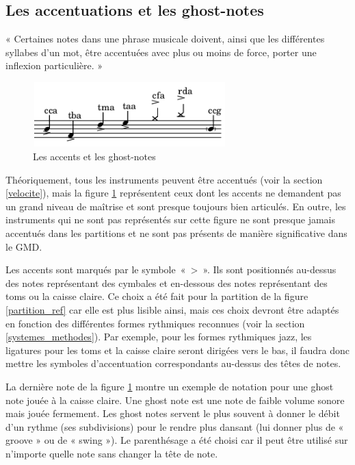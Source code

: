 \subsection*{Les accentuations et les ghost-notes}
« Certaines notes dans une phrase musicale doivent, ainsi que les différentes
syllabes d’un mot, être accentuées avec plus ou moins de force, porter une
inflexion particulière. » \cite{danhauser}
\begin{figure}[h]
\centering
\includegraphics[height=25mm, width=75mm]{
z_images/3_methodes/0_notation_de_la_batterie/8_accents_et_ghost-notes_0.png}
\caption{Les accents et les ghost-notes}
\label{accents_et_gn}
\end{figure}

Théoriquement, tous les instruments peuvent être accentués (voir la section
\ref{velocite}), mais la figure \ref{accents_et_gn} représentent ceux dont les
accents ne demandent pas un grand niveau de maîtrise et sont presque toujours
bien articulés. En outre, les instruments qui ne sont pas représentés sur cette
figure ne sont presque jamais accentués dans les partitions et ne sont pas
présents de manière significative dans le GMD.

Les accents sont marqués par le symbole~«~>~». Ils sont positionnés au-dessus
des notes représentant des cymbales et en-dessous des notes représentant des
toms ou la caisse claire. Ce choix a été fait pour la partition de la figure
\ref{partition_ref} car elle est plus lisible ainsi, mais ces choix devront
être adaptés en fonction des différentes formes rythmiques reconnues (voir la
section \ref{systemes_methodes}). Par exemple, pour les formes rythmiques jazz,
les ligatures pour les toms et la caisse claire seront dirigées vers le bas, il
faudra donc mettre les symboles d’accentuation correspondants au-dessus des
têtes de notes.

La dernière note de la figure \ref{accents_et_gn} montre un exemple de notation
pour une ghost note jouée à la caisse claire. Une ghost note
\cite{lexique_drum} est une note de faible volume sonore mais jouée fermement.
Les ghost notes servent le plus souvent à donner le débit d’un rythme (ses
subdivisions) pour le rendre plus dansant (lui donner plus de « groove » ou de
« swing »). Le parenthésage a été choisi car il peut être utilisé sur n’importe
quelle note sans changer la tête de note.

